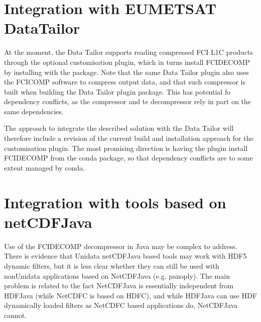 \documentclass[a4paper,10pt,english]{sphinxmanual}
\begin{document}
\section{Integration with EUMETSAT Data\sphinxhyphen{}Tailor}
\label{\detokenize{support_and_integration:integration-with-eumetsat-data-tailor}}
\sphinxAtStartPar
At the moment, the Data Tailor supports reading compressed FCI L1C products through the optional
 customisation plugin, which in turns install FCIDECOMP by installing with  the
 package. Note that the same Data Tailor plugin also uses the FCICOMP software to compress output data,
and that such compressor is built when building the Data Tailor plugin package. This has potential fo dependency
conflicts, as the compressor and te decompressor rely in part on the same dependencies.

\sphinxAtStartPar
The approach to integrate the described solution with the Data Tailor will therefore include a revision of the current
build and installation approach for the  customisation plugin. The most promising
direction is having the plugin install FCIDECOMP from the conda package, so that dependency conflicts are to some
extent managed by conda.


\section{Integration with tools based on netCDF\sphinxhyphen{}Java}
\label{\detokenize{support_and_integration:integration-with-tools-based-on-netcdf-java}}
\sphinxAtStartPar
Use of the FCIDECOMP decompressor in Java may be complex to address. There is evidence that Unidata netCDF\sphinxhyphen{}Java based
tools may work with HDF5 dynamic filters, but it is less clear whether they can still be used with non\sphinxhyphen{}Unidata
applications based on NetCDF\sphinxhyphen{}Java (e.g. panoply). The main problem is related to the fact NetCDF\sphinxhyphen{}Java is essentially
independent from HDF\sphinxhyphen{}Java (while NetCDF\sphinxhyphen{}C is based on HDF\sphinxhyphen{}C), and while HDF\sphinxhyphen{}Java can use HDF dynamically loaded filters
as NetCDF\sphinxhyphen{}C based applications do, NetCDF\sphinxhyphen{}Java cannot.
\end{document}

